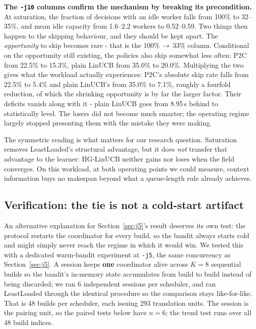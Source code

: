 \documentclass[final,5p,times,twocolumn]{elsarticle}
\begin{document}
\textbf{The \texttt{-j10} columns confirm the mechanism by breaking its precondition.} At saturation, the fraction of decisions with an idle worker falls from 100\% to 32--35\%, and mean idle capacity from 1.6--2.2 workers to 0.52--0.59. Two things then happen to the skipping behaviour, and they should be kept apart. The \emph{opportunity} to skip becomes rare - that is the 100\%\,$\to$\,33\% column. Conditional on the opportunity still existing, the policies also skip somewhat less often: P2C from 22.5\% to 15.3\%, plain LinUCB from 35.0\% to 20.0\%. Multiplying the two gives what the workload actually experiences: P2C's absolute skip rate falls from 22.5\% to 5.4\% and plain LinUCB's from 35.0\% to 7.1\%, roughly a fourfold reduction, of which the shrinking opportunity is by far the larger factor. Their deficits vanish along with it - plain LinUCB goes from 8.95\,s behind to statistically level. The losers did not become much smarter; the operating regime largely stopped presenting them with the mistake they were making.

The symmetric reading is what matters for our research question. Saturation removes LeastLoaded's structural advantage, but it does \emph{not} transfer that advantage to the learner: HG-LinUCB neither gains nor loses when the field converges. On this workload, at both operating points we could measure, context information buys no makespan beyond what a queue-length rule already achieves.

\subsection{Verification: the tie is not a cold-start artifact}
\label{sec:coldstart}

An alternative explanation for Section~\ref{sec:j5}'s result deserves its own test: the protocol restarts the coordinator for every build, so the bandit always starts cold and might simply never reach the regime in which it would win. We tested this with a dedicated warm-bandit experiment at \texttt{-j5}, the same concurrency as Section~\ref{sec:j5}. A session keeps \textbf{one} coordinator alive across $K=8$ sequential builds so the bandit's in-memory state accumulates from build to build instead of being discarded; we ran 6 independent sessions per scheduler, and ran LeastLoaded through the identical procedure so the comparison stays like-for-like. That is 48 builds per scheduler, each issuing 293 translation units. The session is the pairing unit, so the paired tests below have $n=6$; the trend test runs over all 48 build indices.
\end{document}
